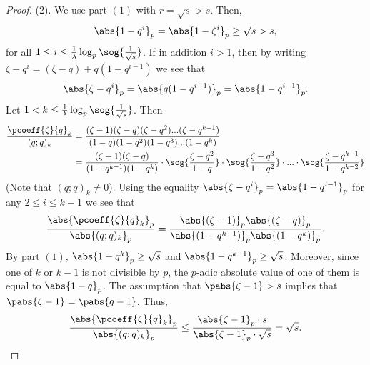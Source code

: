 \begin{proof}
    (2). We use part $(1)$ with $r=\sqrt{s}>s$.
    Then,
    \[\abs{1-q^i}_p=\abs{1-\zeta^i}_p\geq \sqrt{s}>s,\]
     for all $1\leq i\leq \frac{1}{\lambda}\log_p\sog{\frac{1}{\sqrt{s}}}$.
    If in addition $i>1$, then by writing $\zeta-q^i=(\zeta-q)+q(1-q^{i-1})$ we see that 
    \[\abs{\zeta-q^i}_p=\abs{q(1-q^{i-1})}_p=\abs{1-q^{i-1}}_p.\]
    Let $1<k\leq \frac{1}{\lambda}\log_p\sog{\frac{1}{\sqrt{s}}}$.
    Then        \begin{align*}
        \frac{\pcoeff{\zeta}{q}_k}{(q;q)_k}
    &=\frac{(\zeta-1)(\zeta-q)(\zeta-q^2)...(\zeta-q^{k-1})}{(1-q)(1-q^2)(1-q^3)...(1-q^k)}\\  
    &=\frac{(\zeta-1)(\zeta-q)}{(1-q^{k-1})(1-q^k)}\cdot\sog{\frac{\zeta-q^2}{1-q}}\cdot\sog{\frac{\zeta-q^3}{1-q^2}}\cdot...\cdot\sog{\frac{\zeta-q^{k-1}}{1-q^{k-2}}}
        \end{align*} 
    (Note that $(q;q)_k\neq 0$).
    Using the equality $\abs{\zeta-q^i}_p=\abs{1-q^{i-1}}_p$ for any $2\leq i\leq k-1$ we see that
    \[\frac{\abs{\pcoeff{\zeta}{q}_k}_p}{\abs{(q;q)_k}_p}=\frac{\abs{(\zeta-1)}_p\abs{(\zeta-q)}_p}{\abs{(1-q^{k-1})}_p\abs{(1-q^k)}_p}.\]
    By part $(1)$, $\abs{1-q^k}_p\geq \sqrt{s}$ and $\abs{1-q^{k-1}}_p\geq \sqrt{s}$.
    Moreover, since one of $k$ or $k-1$ is not divisible by $p$, the $p$-adic absolute value of one of them is equal to $\abs{1-q}_p$.
    The assumption that $\pabs{\zeta-1}>s$ implies that $\pabs{\zeta-1}=\pabs{q-1}$.  
    Thus, 
    \[\frac{\abs{\pcoeff{\zeta}{q}_k}_p}{\abs{(q;q)_k}_p}\leq \frac{\abs{\zeta-1}_p\cdot s}{\abs{\zeta-1}_p\cdot \sqrt{s}}=\sqrt{s}.\]
    \end{proof} 

